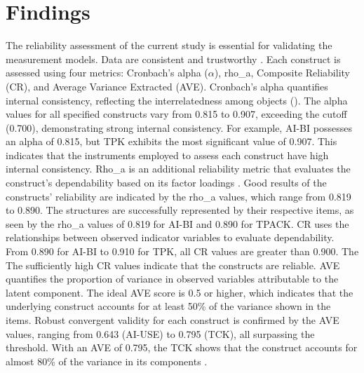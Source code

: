 \documentclass[english]{textolivre}
\begin{document}
\section{Findings}\label{sec-links}

The reliability assessment of the current study is essential for validating the measurement models. Data are consistent and trustworthy \cite{hair2024plssem,vaithilingam2024robustness}. Each construct is assessed using four metrics: Cronbach’s alpha ($ \alpha $), rho\_a, Composite Reliability (CR), and Average Variance Extracted (AVE). Cronbach’s alpha quantifies internal consistency, reflecting the interrelatedness among objects (). The alpha values for all specified constructs vary from 0.815 to 0.907, exceeding the cutoff (0.700), demonstrating strong internal consistency. For example, AI-BI possesses an alpha of 0.815, but TPK exhibits the most significant value of 0.907. This indicates that the instruments employed to assess each construct have high internal consistency. Rho\_a is an additional reliability metric that evaluates the construct’s dependability based on its factor loadings \cite{vaithilingam2024robustness}. Good results of the constructs' reliability are indicated by the rho\_a values, which range from 0.819 to 0.890. The structures are successfully represented by their respective items, as seen by the rho\_a values of 0.819 for AI-BI and 0.890 for TPACK. CR uses the relationships between observed indicator variables to evaluate dependability. From 0.890 for AI-BI to 0.910 for TPK, all CR values are greater than 0.900. The The sufficiently high CR values indicate that the constructs are reliable. AVE quantifies the proportion of variance in observed variables attributable to the latent component. The ideal AVE score is 0.5 or higher, which indicates that the underlying construct accounts for at least 50\% of the variance shown in the items. Robust convergent validity for each construct is confirmed by the AVE values, ranging from 0.643 (AI-USE) to 0.795 (TCK), all surpassing the threshold. With an AVE of 0.795, the TCK shows that the construct accounts for almost 80\% of the variance in its components \cite{habibi2023vocational,teeluckdharry2024roadmap}.
\end{document}
